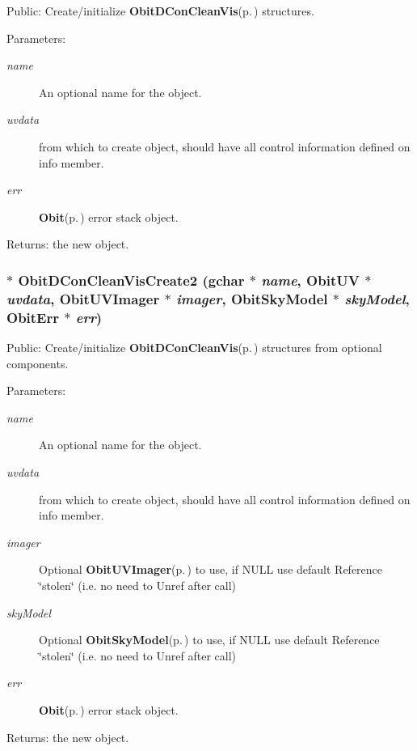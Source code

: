 Public: Create/initialize {\bf Obit\-DCon\-Clean\-Vis}{\rm (p.\,\pageref{structObitDConCleanVis})} structures. 

\begin{Desc}
\item[Parameters:]
\begin{description}
\item[{\em name}]An optional name for the object. \item[{\em uvdata}]from which to create object, should have all control information defined on info member. \item[{\em err}]{\bf Obit}{\rm (p.\,\pageref{structObit})} error stack object. \end{description}
\end{Desc}
\begin{Desc}
\item[Returns:]the new object. \end{Desc}
\subsubsection{$\ast$ Obit\-DCon\-Clean\-Vis\-Create2 (gchar $\ast$ {\em name}, {\bf Obit\-UV} $\ast$ {\em uvdata}, {\bf Obit\-UVImager} $\ast$ {\em imager}, {\bf Obit\-Sky\-Model} $\ast$ {\em sky\-Model}, {\bf Obit\-Err} $\ast$ {\em err})}\label{ObitDConCleanVis_8c_a17}


Public: Create/initialize {\bf Obit\-DCon\-Clean\-Vis}{\rm (p.\,\pageref{structObitDConCleanVis})} structures from optional components. 

\begin{Desc}
\item[Parameters:]
\begin{description}
\item[{\em name}]An optional name for the object. \item[{\em uvdata}]from which to create object, should have all control information defined on info member. \item[{\em imager}]Optional {\bf Obit\-UVImager}{\rm (p.\,\pageref{structObitUVImager})} to use, if NULL use default Reference \char`\"{}stolen\char`\"{} (i.e. no need to Unref after call) \item[{\em sky\-Model}]Optional {\bf Obit\-Sky\-Model}{\rm (p.\,\pageref{structObitSkyModel})} to use, if NULL use default Reference \char`\"{}stolen\char`\"{} (i.e. no need to Unref after call) \item[{\em err}]{\bf Obit}{\rm (p.\,\pageref{structObit})} error stack object. \end{description}
\end{Desc}
\begin{Desc}
\item[Returns:]the new object. \end{Desc}
